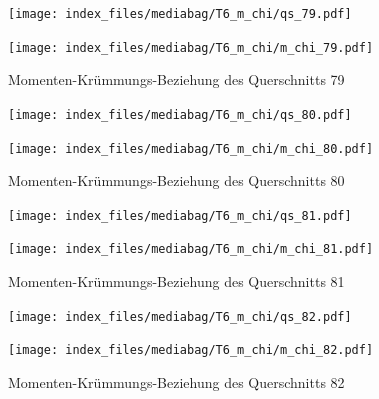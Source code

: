 \documentclass[
  11pt,
  letterpaper,
]{scrreprt}
\begin{document}
\begin{figure}[H]

\begin{minipage}{0.50\linewidth}
\texttt{[image: index\_files/mediabag/T6\_m\_chi/qs\_79.pdf]}\end{minipage}%
%
\begin{minipage}{0.50\linewidth}
\texttt{[image: index\_files/mediabag/T6\_m\_chi/m\_chi\_79.pdf]}\end{minipage}%

\caption{\label{fig-mchi_anhang}Momenten-Krümmungs-Beziehung des
Querschnitts 79}

\end{figure}%

\begin{figure}[H]

\begin{minipage}{0.50\linewidth}
\texttt{[image: index\_files/mediabag/T6\_m\_chi/qs\_80.pdf]}\end{minipage}%
%
\begin{minipage}{0.50\linewidth}
\texttt{[image: index\_files/mediabag/T6\_m\_chi/m\_chi\_80.pdf]}\end{minipage}%

\caption{\label{fig-mchi_anhang}Momenten-Krümmungs-Beziehung des
Querschnitts 80}

\end{figure}%

\begin{figure}[H]

\begin{minipage}{0.50\linewidth}
\texttt{[image: index\_files/mediabag/T6\_m\_chi/qs\_81.pdf]}\end{minipage}%
%
\begin{minipage}{0.50\linewidth}
\texttt{[image: index\_files/mediabag/T6\_m\_chi/m\_chi\_81.pdf]}\end{minipage}%

\caption{\label{fig-mchi_anhang}Momenten-Krümmungs-Beziehung des
Querschnitts 81}

\end{figure}%

\begin{figure}[H]

\begin{minipage}{0.50\linewidth}
\texttt{[image: index\_files/mediabag/T6\_m\_chi/qs\_82.pdf]}\end{minipage}%
%
\begin{minipage}{0.50\linewidth}
\texttt{[image: index\_files/mediabag/T6\_m\_chi/m\_chi\_82.pdf]}\end{minipage}%

\caption{\label{fig-mchi_anhang}Momenten-Krümmungs-Beziehung des
Querschnitts 82}

\end{figure}%
\end{document}
